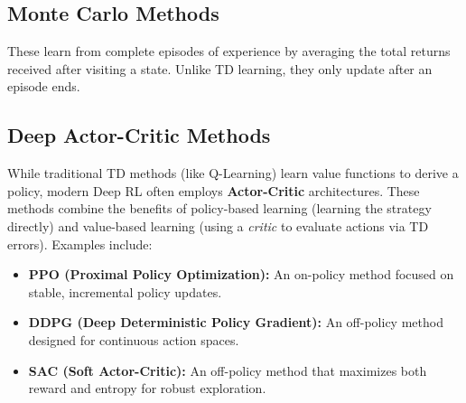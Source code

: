\documentclass{article}
\begin{document}
\subsection{Monte Carlo Methods}

These learn from complete episodes of experience by averaging the total returns received after visiting a state. Unlike TD learning, they only update after an episode ends.

\subsection{Deep Actor-Critic Methods}
While traditional TD methods (like Q-Learning) learn value functions to derive a policy, modern Deep RL often employs \textbf{Actor-Critic} architectures. These methods combine the benefits of policy-based learning (learning the strategy directly) and value-based learning (using a \textit{critic} to evaluate actions via TD errors). Examples include:

\begin{itemize}
    \item \textbf{PPO (Proximal Policy Optimization):} An on-policy method focused on stable, incremental policy updates.
    \item \textbf{DDPG (Deep Deterministic Policy Gradient):} An off-policy method designed for continuous action spaces.
    \item \textbf{SAC (Soft Actor-Critic):} An off-policy method that maximizes both reward and entropy for robust exploration.
\end{itemize}

\newpage
\glsaddall
\printglossaries
\end{document}
